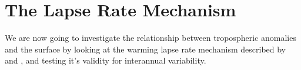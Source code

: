 


\section{The Lapse Rate Mechanism}

We are now going to investigate the relationship between tropospheric anomalies 
and the surface by looking at the warming lapse rate mechanism described by 
\citet{Joshi2007} and \citet{Byrne2013a}, and testing it's validity for 
interannual variability. 

